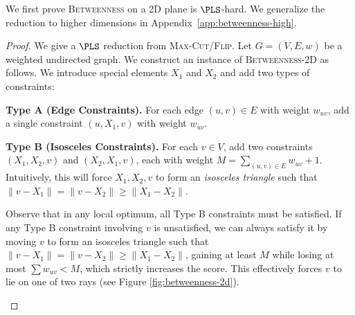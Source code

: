 \documentclass{article}
\theoremstyle{definition}  %
\theoremstyle{plain}
\numberwithin{observation}{section}
\numberwithin{claim}{section}
\numberwithin{fact}{section}
\numberwithin{lemma}{section}
\numberwithin{proposition}{section}
\numberwithin{theorem}{section}
\numberwithin{corollary}{section}
\numberwithin{definition}{section}
\theoremstyle{plain}
\begin{document}
We first prove \textsc{Betweenness} on a 2D plane is $\PLS$-hard. We generalize the reduction to higher dimensions in Appendix~\ref{app:betweenness-high}.

\begin{proof}
We give a $\PLS$ reduction from \textsc{Max-Cut/Flip}.
Let $G = (V, E, w)$ be a weighted undirected graph. We construct an instance of \textsc{Betweenness-2D} as follows. We introduce special elements $X_1$ and $X_2$ and add two types of constraints:

\item \textbf{Type A (Edge Constraints).}
For each edge $(u, v) \in E$ with weight $w_{uv}$, add a single constraint $(u, X_1, v)$ with weight $w_{uv}$.

\item \textbf{Type B (Isosceles Constraints).}
For each $v \in V$, add two constraints $(X_1, X_2, v)$ and $(X_2, X_1, v)$, each with weight $M = \sum_{(u,v) \in E} w_{uv} + 1$.
Intuitively, this will force $X_1, X_2, v$ to form an \emph{isosceles triangle} such that $\| v - X_1 \| = \| v - X_2 \| \geq \| X_1 - X_2 \|$.

Observe that in any local optimum, all Type B constraints must be satisfied. If any Type B constraint involving $v$ is unsatisfied, we can always satisfy it by moving $v$ to form an isosceles triangle such that $\|v - X_1\| = \|v - X_2\| \geq \|X_1 - X_2\|$, gaining at least $M$ while losing at most $\sum w_{uv} < M$, which strictly increases the score. This effectively forces $v$ to lie on one of two rays (see Figure \ref{fig:betweenness-2d}).

\begin{figure}[h]
    \centering
    \begin{minipage}{0.45\textwidth}
        \centering
\end{minipage}
\end{figure}
\end{proof}
\end{document}
